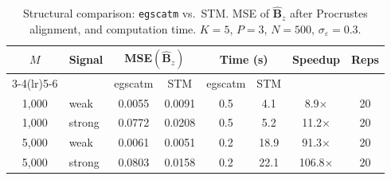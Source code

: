 \begin{table}[t]
\centering
\caption{Structural comparison: \texttt{egscatm} vs.\ STM. MSE of $\hat{\mathbf{B}}_z$ after Procrustes alignment, and computation time. $K=5$, $P=3$, $N=500$, $\sigma_\varepsilon=0.3$.}
\label{tab:block3}
\begin{tabular}{clcccccc}
\toprule
$M$ & Signal & \multicolumn{2}{c}{MSE$(\hat{\mathbf{B}}_z)$} & \multicolumn{2}{c}{Time (s)} & Speedup & Reps \\
\cmidrule(lr){3-4}\cmidrule(lr){5-6}
 & & egscatm & STM & egscatm & STM & & \\
\midrule
1,000 & weak & 0.0055 & 0.0091 & 0.5 & 4.1 & 8.9$\times$ & 20 \\
1,000 & strong & 0.0772 & 0.0208 & 0.5 & 5.2 & 11.2$\times$ & 20 \\
5,000 & weak & 0.0061 & 0.0051 & 0.2 & 18.9 & 91.3$\times$ & 20 \\
5,000 & strong & 0.0803 & 0.0158 & 0.2 & 22.1 & 106.8$\times$ & 20 \\
\bottomrule
\end{tabular}
\end{table}

